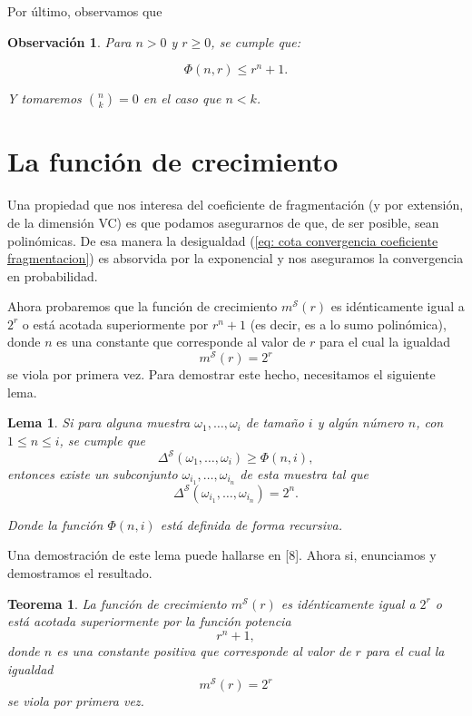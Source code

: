 \documentclass{report}
\newtheorem{thm}{Teorema}[section]
\newtheorem{lem}{Lema}[section]
\newtheorem{obs}{Observación}[section]
\begin{document}
Por último, observamos que

\begin{obs}   
Para \( n > 0 \) y \( r \geq 0 \), se cumple que:

\[
\Phi(n, r) \leq r^n + 1.
\]

Y tomaremos \( \binom{n}{k} = 0 \) en el caso que \( n < k \).\newline
\end{obs}

\section{La función de crecimiento}

Una propiedad que nos interesa del coeficiente de fragmentación (y por extensión, de la dimensión VC) es que podamos asegurarnos
de que, de ser posible, sean polinómicas. De esa manera la desigualdad (\ref{eq: cota convergencia coeficiente fragmentacion})
es absorvida por la exponencial y nos aseguramos la convergencia en probabilidad. \newline

Ahora probaremos que la función de crecimiento $m^{\mathcal{S}}(r)$ 
es idénticamente igual a \( 2^r \) o está acotada superiormente por \( r^n + 1 \) (es decir, es a lo sumo polinómica),  
donde \( n \) es una constante que corresponde al valor de \( r \) para el cual la igualdad  
\[
m^{\mathcal{S}}(r) = 2^r
\]
se viola por primera vez. Para demostrar este hecho, necesitamos el siguiente lema.\newline

\begin{lem}\label{Lema 1}
Si para alguna muestra  \( \omega_1, \ldots, \omega_i \) de tamaño $i$ y algún número \( n \), con \( 1 \leq n \leq i \),  
se cumple que  
\[
\Delta^{\mathcal{S}}(\omega_1, \ldots, \omega_i) \geq \Phi(n, i),
\]  
entonces existe un subconjunto \( \omega_{i_1}, \dots, \omega_{i_n} \) de esta muestra tal que  
\[
\Delta^{\mathcal{S}}(\omega_{i_1}, \dots,\omega_{i_n}) = 2^n.
\]  

Donde la función \( \Phi(n, i) \) está definida de forma recursiva.  \newline
\end{lem}

Una demostración de este lema puede hallarse en [8].
Ahora si, enunciamos y demostramos el resultado.\newline

\begin{thm} \label{teo: cota polinomica de la función de crecimiento}
    La función de crecimiento \( m^{\mathcal{S}}(r) \) es idénticamente igual a \( 2^r \) o está acotada superiormente por la función potencia  
    \[
    r^n + 1,
    \]
    donde \( n \) es una constante positiva que corresponde al valor de \( r \) para el cual la igualdad  
    \[
    m^{\mathcal{S}}(r) = 2^r
    \]
    se viola por primera vez.    
\end{thm}
\end{document}
